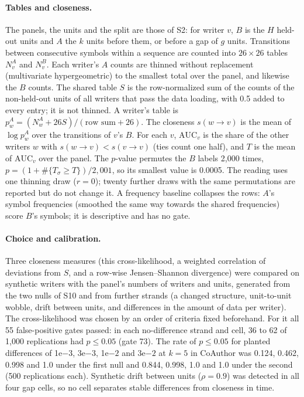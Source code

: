 \documentclass[10pt]{article}
\newcommand{\e}[2]{#1e$#2$}
\begin{document}
\paragraph{Tables and closeness.} The panels, the units and the split are those of S2: for writer $v$, $B$ is the $H$ held-out units and $A$ the $k$ units before them, or before a gap of $g$ units. Transitions between consecutive symbols within a sequence are counted into $26\times26$ tables $N^A_v$ and $N^B_v$. Each writer's $A$ counts are thinned without replacement (multivariate hypergeometric) to the smallest total over the panel, and likewise the $B$ counts. The shared table $S$ is the row-normalized sum of the counts of the non-held-out units of all writers that pass the data loading, with 0.5 added to every entry; it is not thinned. A writer's table is $p^A_w=(N^A_w+26S)/(\text{row sum}+26)$. The closeness $s(w\to v)$ is the mean of $\log p^A_w$ over the transitions of $v$'s $B$. For each $v$, $\mathrm{AUC}_v$ is the share of the other writers $w$ with $s(w\to v)<s(v\to v)$ (ties count one half), and $T$ is the mean of $\mathrm{AUC}_v$ over the panel. The $p$-value permutes the $B$ labels 2,000 times, $p=(1+\#\{T_\sigma\ge T\})/2{,}001$, so its smallest value is 0.0005. The reading uses one thinning draw ($r=0$); twenty further draws with the same permutations are reported but do not change it. A frequency baseline collapses the rows: $A$'s symbol frequencies (smoothed the same way towards the shared frequencies) score $B$'s symbols; it is descriptive and has no gate.

\paragraph{Choice and calibration.} Three closeness measures (this cross-likelihood, a weighted correlation of deviations from $S$, and a row-wise Jensen--Shannon divergence) were compared on synthetic writers with the panel's numbers of writers and units, generated from the two nulls of S10 and from further strands (a changed structure, unit-to-unit wobble, drift between units, and differences in the amount of data per writer). The cross-likelihood was chosen by an order of criteria fixed beforehand. For it all 55 false-positive gates passed: in each no-difference strand and cell, 36 to 62 of 1,000 replications had $p\le0.05$ (gate 73). The rate of $p\le0.05$ for planted differences of \e{1}{-3}, \e{3}{-3}, \e{1}{-2} and \e{3}{-2} at $k=5$ in CoAuthor was 0.124, 0.462, 0.998 and 1.0 under the first null and 0.844, 0.998, 1.0 and 1.0 under the second (500 replications each). Synthetic drift between units ($\rho=0.9$) was detected in all four gap cells, so no cell separates stable differences from closeness in time.
\end{document}
